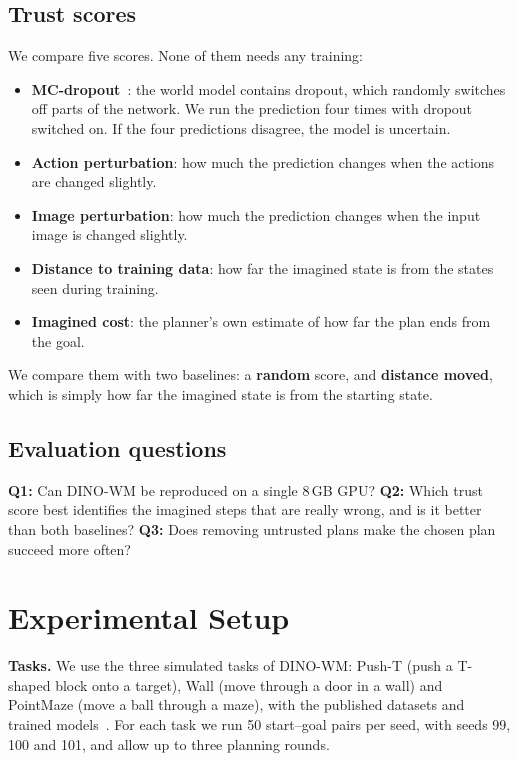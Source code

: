 \documentclass[conference]{IEEEtran}
\begin{document}
\subsection{Trust scores}
We compare five scores. None of them needs any training:
\begin{itemize}
\item \textbf{MC-dropout}~\cite{ref23}: the world model contains dropout, which randomly switches off parts of the
network. We run the prediction four times with dropout switched on. If the four predictions disagree, the model is
uncertain.
\item \textbf{Action perturbation}: how much the prediction changes when the actions are changed slightly.
\item \textbf{Image perturbation}: how much the prediction changes when the input image is changed slightly.
\item \textbf{Distance to training data}: how far the imagined state is from the states seen during training.
\item \textbf{Imagined cost}: the planner's own estimate of how far the plan ends from the goal.
\end{itemize}
We compare them with two baselines: a \textbf{random} score, and \textbf{distance moved}, which is simply how far the
imagined state is from the starting state.

\subsection{Evaluation questions}
\textbf{Q1:} Can DINO-WM be reproduced on a single 8\,GB GPU? \textbf{Q2:} Which trust score best identifies the
imagined steps that are really wrong, and is it better than both baselines? \textbf{Q3:} Does removing untrusted plans
make the chosen plan succeed more often?

\section{Experimental Setup}

\textbf{Tasks.} We use the three simulated tasks of DINO-WM: Push-T (push a T-shaped block onto a target), Wall (move
through a door in a wall) and PointMaze (move a ball through a maze), with the published datasets and trained
models~\cite{ref26}. For each task we run 50 start--goal pairs per seed, with seeds 99, 100 and 101, and allow up to
three planning rounds.
\end{document}
